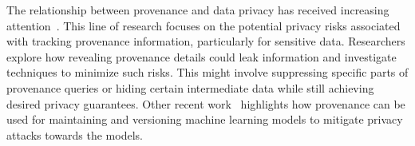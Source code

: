 The relationship between provenance and data privacy has received increasing attention~\cite{PanSR23provenance_sec_privacy,DavidsonKRSTC11prov_privacy,DavidsonKMPR11provenance,DeutchFGM21optimizing_privacy_utility_provenance,Pappachan2022tattletale,PappachanZHM23}. This line of research focuses on the potential privacy risks associated with tracking provenance information, particularly for sensitive data. Researchers explore how revealing provenance details could leak information and investigate techniques to minimize such risks. This might involve suppressing specific parts of provenance queries or hiding certain intermediate data while still achieving desired privacy guarantees.
Other recent work~\cite{WuTD22provenance} highlights how provenance can be used for maintaining and versioning machine learning models to mitigate privacy attacks towards the models.

